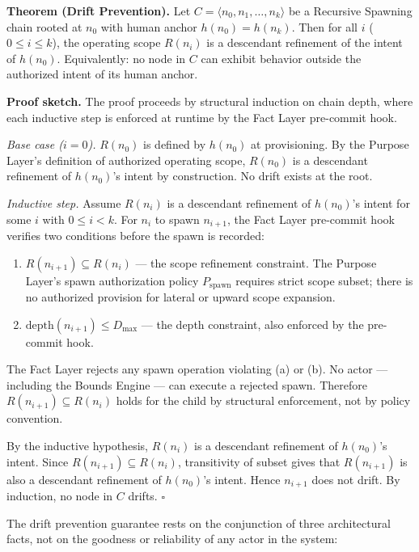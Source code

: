 \medskip
\noindent\textbf{Theorem (Drift Prevention).} Let $C = \langle n_0, n_1, \ldots, n_k \rangle$ be a Recursive Spawning chain rooted at $n_0$ with human anchor $h(n_0) = h(n_k)$. Then for all $i$ ($0 \leq i \leq k$), the operating scope $R(n_i)$ is a descendant refinement of the intent of $h(n_0)$. Equivalently: no node in $C$ can exhibit behavior outside the authorized intent of its human anchor.

\medskip
\noindent\textbf{Proof sketch.} The proof proceeds by structural induction on chain depth, where each inductive step is enforced at runtime by the Fact Layer pre-commit hook.

\medskip
\textit{Base case ($i=0$).} $R(n_0)$ is defined by $h(n_0)$ at provisioning. By the Purpose Layer's definition of authorized operating scope, $R(n_0)$ is a descendant refinement of $h(n_0)$'s intent by construction. No drift exists at the root.

\medskip
\textit{Inductive step.} Assume $R(n_i)$ is a descendant refinement of $h(n_0)$'s intent for some $i$ with $0 \leq i < k$. For $n_i$ to spawn $n_{i+1}$, the Fact Layer pre-commit hook verifies two conditions before the spawn is recorded:

\begin{enumerate}
    \item[(a)] $R(n_{i+1}) \subseteq R(n_i)$ --- the scope refinement constraint. The Purpose Layer's spawn authorization policy $P_{\mathrm{spawn}}$ requires strict scope subset; there is no authorized provision for lateral or upward scope expansion.
    \item[(b)] $\mathrm{depth}(n_{i+1}) \leq D_{\mathrm{max}}$ --- the depth constraint, also enforced by the pre-commit hook.
\end{enumerate}

The Fact Layer rejects any spawn operation violating (a) or (b). No actor --- including the Bounds Engine --- can execute a rejected spawn. Therefore $R(n_{i+1}) \subseteq R(n_i)$ holds for the child by structural enforcement, not by policy convention.

By the inductive hypothesis, $R(n_i)$ is a descendant refinement of $h(n_0)$'s intent. Since $R(n_{i+1}) \subseteq R(n_i)$, transitivity of subset gives that $R(n_{i+1})$ is also a descendant refinement of $h(n_0)$'s intent. Hence $n_{i+1}$ does not drift. By induction, no node in $C$ drifts. $\square$

\medskip
The drift prevention guarantee rests on the conjunction of three architectural facts, not on the goodness or reliability of any actor in the system:


